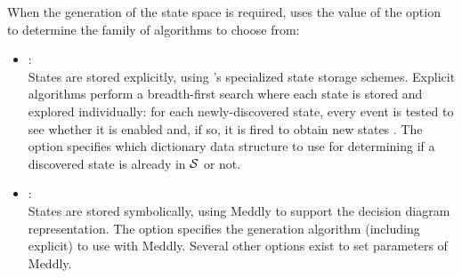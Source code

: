 When the generation of the state space is required,
{\smart} uses the value of the  option
to determine the family of algorithms to choose from:
\begin{itemize}
  \item {}:\\
  States are stored explicitly, using {\smart}'s specialized state storage
  schemes.
  Explicit algorithms perform a breadth-first search where
  each state is stored and explored individually: for each
  newly-discovered state, every event is tested to see whether it is enabled
  and, if so, it is fired to obtain new states
  \cite{1997Tools-Storage}.
  The option  specifies which dictionary 
  data structure to use for determining if a discovered state
  is already in $\mathcal{S}$ or not.

  \item {}:\\
  States are stored symbolically, using Meddly to support
  the decision diagram representation.
  The option  specifies
  the generation algorithm (including explicit)
  to use with Meddly.
  Several other options exist to set parameters of Meddly.
\end{itemize}

